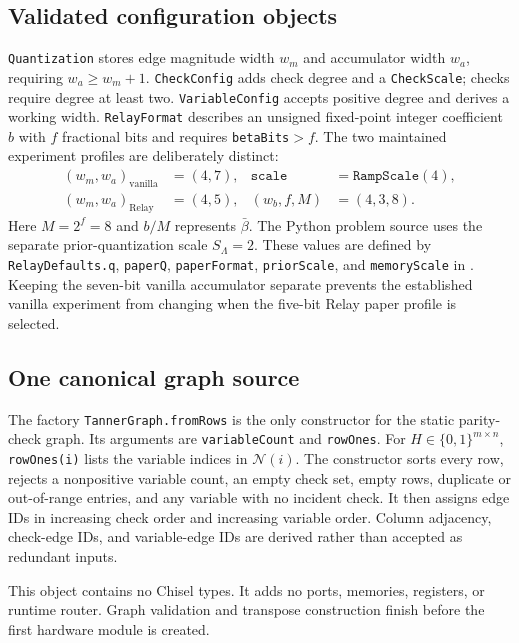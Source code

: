 \documentclass[10pt,conference]{IEEEtran}
\begin{document}
\subsection{Validated configuration objects}
\texttt{Quantization} stores edge magnitude width $w_m$ and accumulator width
$w_a$, requiring $w_a\geq w_m+1$.  \texttt{CheckConfig} adds check degree and
a \texttt{CheckScale}; checks require degree at least two.
\texttt{VariableConfig} accepts positive degree and derives a working width.
\texttt{RelayFormat} describes an unsigned fixed-point integer coefficient
$b$ with $f$ fractional bits and requires \texttt{betaBits}$>f$.
The two maintained experiment profiles are deliberately distinct:
\begin{align}
 (w_m,w_a)_{\mathrm{vanilla}}&=(4,7),
 &\texttt{scale}&=\texttt{RampScale}(4),\label{eq:vanilla-format}\\
 (w_m,w_a)_{\mathrm{Relay}}&=(4,5),
 &(w_b,f,M)&=(4,3,8).\label{eq:relay-format}
\end{align}
Here $M=2^f=8$ and $b/M$ represents $\bar\beta$.  The Python problem source
uses the separate prior-quantization scale $S_\Lambda=2$.  These values are
defined by \texttt{RelayDefaults.q}, \texttt{paperQ}, \texttt{paperFormat},
\texttt{priorScale}, and \texttt{memoryScale} in .  Keeping
the seven-bit vanilla accumulator separate prevents the established vanilla
experiment from changing when the five-bit Relay paper profile is selected.

\subsection{One canonical graph source}
The factory \texttt{TannerGraph.fromRows} is the only constructor for the
static parity-check graph.  Its arguments are \texttt{variableCount} and
\texttt{rowOnes}.  For $H\in\{0,1\}^{m\times n}$, \texttt{rowOnes(i)} lists
the variable indices in $\mathcal{N}(i)$.  The
constructor sorts every row, rejects a nonpositive variable count, an empty
check set, empty rows, duplicate or out-of-range entries, and any variable with
no incident check.  It then assigns edge IDs in increasing check order and
increasing variable order.  Column adjacency, check-edge IDs, and variable-edge
IDs are derived rather than accepted as redundant inputs.

This object contains no Chisel types.  It adds no ports, memories, registers,
or runtime router.  Graph validation and transpose construction finish before
the first hardware module is created.
\end{document}
